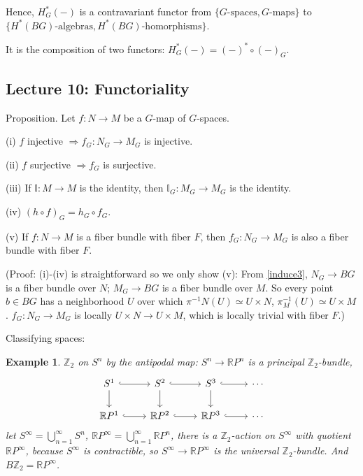 \documentclass{article}
\theoremstyle{mystyle}
\newtheorem*{example}{Example}
\theoremstyle{remark}
\numberwithin{equation}{section}
\begin{document}
Hence, $H^*_G(-)$ is a contravariant functor from $\{G\text{-spaces},G\text{-maps}\}$ to $\{H^*(BG)\text{-algebras},H^*(BG)\text{-homorphisms}\}$. 

It is the composition of two functors: $H^*_G(-) = (-)^* \circ (-)_G$. 



\subsection{Lecture 10: Functoriality}

Proposition. Let $f\colon N\rightarrow M$ be a $G$-map of $G$-spaces. 

(i) $f$ injective $\Rightarrow f_G\colon N_G\rightarrow M_G$ is injective. 

(ii) $f$ surjective $\Rightarrow f_G$ is surjective. 

(iii) If $\mathbb{I}\colon M\rightarrow M$ is the identity, then $\mathbb{I}_G\colon M_G\rightarrow M_G$ is the identity. 

(iv) $(h\circ f)_G = h_G\circ f_G$. 

(v) If $f\colon N\rightarrow M$ is a fiber bundle with fiber $F$, then $f_G\colon N_G\rightarrow M_G$ is also a fiber bundle with fiber $F$. 

(Proof: (i)-(iv) is straightforward so we only show (v): From \eqref{induce3}, $N_G\rightarrow BG$ is a fiber bundle over $N$; $M_G \rightarrow BG$ is a fiber bundle over $M$. So every point $b\in BG$ has a neighborhood $U$ over which $\pi^{-1}N(U)\simeq U\times N$, $\pi^{-1}_M(U)\simeq U\times M$.  $f_G\colon N_G\rightarrow M_G$ is locally $U\times N\rightarrow U\times M$, which is locally trivial with fiber $F$.)

Classifying spaces:

\begin{example} $\mathbb{Z}_2$ on $S^n$ by the antipodal map: $S^n\rightarrow \mathbb{R}P^n$ is a principal $\mathbb{Z}_2$-bundle, 
$$
\begin{tikzcd}
S^1 \ar[r,hook] \ar[d]& S^2 \ar[r,hook]\ar[d] & S^3 \ar[r,hook]\ar[d] & \cdots \\
\mathbb{R}P^1 \ar[r,hook] & \mathbb{R}P^2 \ar[r,hook] & \mathbb{R}P^3 \ar[r,hook] & \cdots
\end{tikzcd}
$$
let $S^\infty = \bigcup_{n=1}^\infty S^n$, $\mathbb{R}P^\infty = \bigcup_{n=1}^\infty \mathbb{R}P^n$, there is a $\mathbb{Z}_2$-action on $S^\infty$ with quotient $\mathbb{R}P^\infty$, because $S^\infty$ is contractible, so $S^\infty\rightarrow \mathbb{R}P^\infty$ is the universal $\mathbb{Z}_2$-bundle. And $B\mathbb{Z}_2 = \mathbb{R}P^\infty$.
\end{example}
\end{document}
